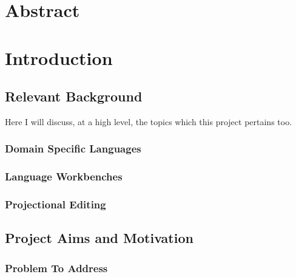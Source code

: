 \documentclass{report}
\begin{document}
\newcommand{\RSetup}[0]{R1\xspace}
\newcommand{\RCustom}[0]{R2\xspace}
\newcommand{\RLightweight}[0]{R3\xspace}
\newcommand{\RIntuitive}[0]{R4\xspace}
\newcommand{\RFamiliarity}{R5\xspace}



%
\section*{Abstract}
\todo{}

\section{Introduction}
\subsection{Relevant Background}
Here I will discuss, at a high level, the topics which this project pertains too.
\subsubsection{Domain Specific Languages}

\subsubsection{Language Workbenches}
\subsubsection{Projectional Editing}
\subsection{Project Aims and Motivation}

\subsubsection{Problem To Address}\label{problem}
\end{document}
